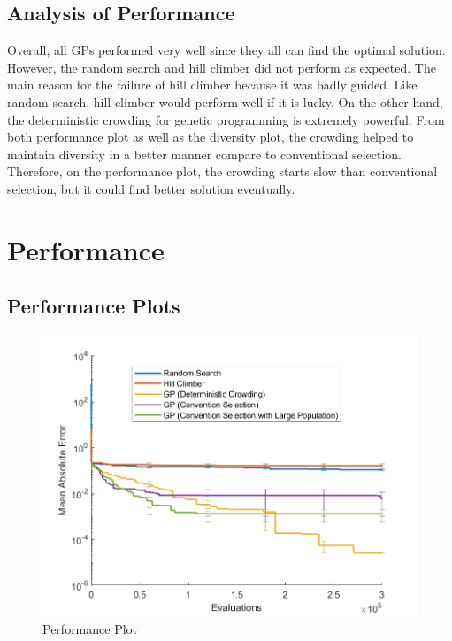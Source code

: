 \documentclass[12pt]{article}
\begin{document}
\subsection{Analysis of Performance}
Overall, all GPs performed very well since they all can find the optimal solution. However, the random search and hill climber did not perform as expected. The main reason for the failure of hill climber because it was badly guided. Like random search, hill climber would perform well if it is lucky. On the other hand, the deterministic crowding for genetic programming is extremely powerful. From both performance plot as well as the diversity plot,  the crowding helped to maintain diversity in a better manner compare to conventional selection. Therefore, on the performance plot, the crowding starts slow than conventional selection, but it could find better solution eventually.

\newpage
\section{Performance}
\subsection{Performance Plots}
\begin{figure}[H]
	\centering
	\includegraphics[width=\textwidth]{performancePlot}
	\caption[]%
	{{\small Performance Plot}}    
\end{figure}
\newpage
\end{document}
